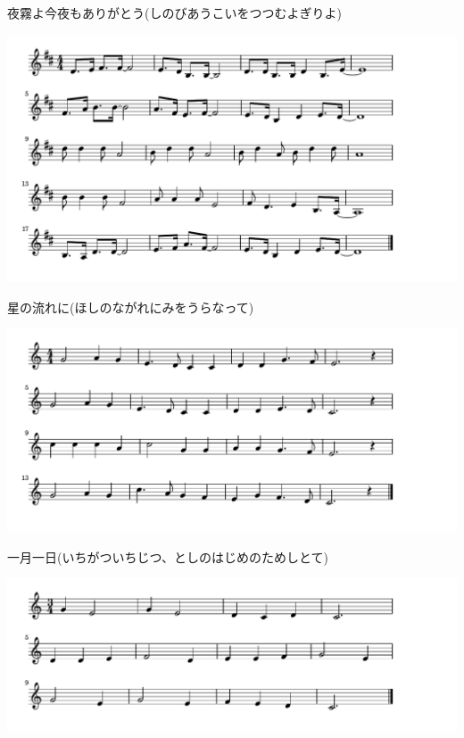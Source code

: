 \documentclass[a4paper]{ltjsarticle}
\begin{document}
\vspace{-10mm} \hspace{10mm}
夜霧よ今夜もありがとう(しのびあうこいをつつむよぎりよ)


\includegraphics[clip]{hoshinonagareni_crop.pdf}

\vspace{-10mm} \hspace{10mm}
星の流れに(ほしのながれにみをうらなって)



\includegraphics[clip]{ichigatsuichijitsu_crop.pdf}

\vspace{-10mm} \hspace{10mm}
一月一日(いちがついちじつ、としのはじめのためしとて)



\includegraphics[clip]{kakkou_crop.pdf}
\end{document}
